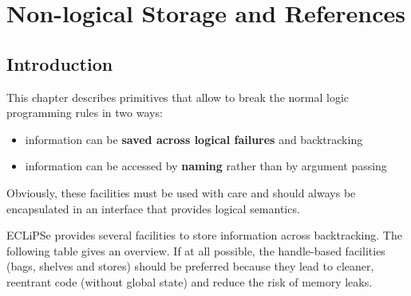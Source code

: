 %
% 
% 
% 
% 
%
%

\chapter{Non-logical Storage and References}
\label{chaparrays}

\section{Introduction}

This chapter describes primitives that allow to break the normal logic
programming rules in two ways:
\begin{itemize}
\item information can be {\bf saved across logical failures} and backtracking
\item information can be accessed by {\bf naming} rather than by argument passing
\end{itemize}
Obviously, these facilities must be used with care and should always
be encapsulated in an interface that provides logical semantics.

ECLiPSe provides several facilities to store information across
backtracking.  The following table gives an overview.  If at all
possible, the handle-based facilities (bags, shelves and stores) should be
preferred because they lead to cleaner, reentrant code (without global
state) and reduce the risk of memory leaks. 

